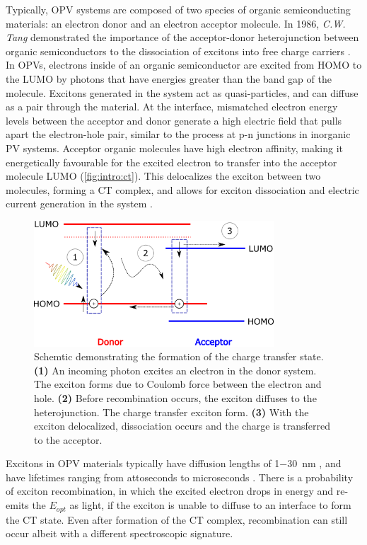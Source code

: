 Typically, \ac{OPV} systems are composed of two species of organic semiconducting materials: an electron donor and an electron acceptor molecule. In 1986, \textit{C.W. Tang} demonstrated the importance of the acceptor-donor heterojunction between organic semiconductors to the dissociation of excitons into free charge carriers \citep{tang1986two}. In \acp{OPV}, electrons inside of an organic semiconductor are excited from \ac{HOMO} to the \ac{LUMO} by photons that have energies greater than the band gap of the molecule. Excitons generated in the system act as quasi-particles, and can diffuse as a pair through the material. At the interface, mismatched electron energy levels between the acceptor and donor generate a high electric field that pulls apart the electron-hole pair, similar to the process at p-n junctions in inorganic PV systems. Acceptor organic molecules have high electron affinity, making it energetically favourable for the excited electron to transfer into the acceptor molecule \ac{LUMO} (\autoref{fig:intro:ct}). This delocalizes the exciton between two molecules, forming a \ac{CT} complex, and allows for exciton dissociation and electric current generation in the system \citep{bernardo2014delocalization}.

\begin{figure}[h]
    \centering
    \includegraphics[width=0.8\textwidth]{pictures/CT_energy.png}
    \caption{Schemtic demonstrating the formation of the charge transfer state. \textbf{(1)} An incoming photon excites an electron in the donor system. The exciton forms due to Coulomb force between the electron and hole. \textbf{(2)} Before recombination occurs, the exciton diffuses to the heterojunction. The charge transfer exciton form. \textbf{(3)} With the exciton delocalized, dissociation occurs and the charge is transferred to the acceptor.}
    \label{fig:intro:ct}
\end{figure}

Excitons in \ac{OPV} materials typically have diffusion lengths of 1\SI{-30}{nm} \citep{proctor2013charge}, and have lifetimes ranging from attoseconds to microseconds \citep{tamai2015exciton}. There is a probability of exciton recombination, in which the excited electron drops in energy and re-emits the $E_{opt}$ as light, if the exciton is unable to diffuse to an interface to form the \ac{CT} state. Even after formation of the \ac{CT} complex, recombination can still occur albeit with a different spectroscopic signature.

